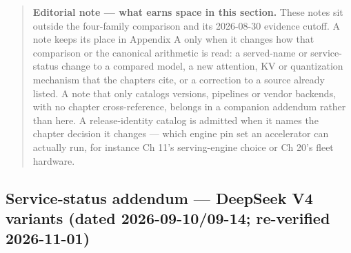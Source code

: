 \begin{quote}
\textbf{Editorial note --- what earns space in this section.} These
notes sit outside the four-family comparison and its 2026-08-30 evidence
cutoff. A note keeps its place in Appendix A only when it changes how
that comparison or the canonical arithmetic is read: a served-name or
service-status change to a compared model, a new attention, KV or
quantization mechanism that the chapters cite, or a correction to a
source already listed. A note that only catalogs versions, pipelines or
vendor backends, with no chapter cross-reference, belongs in a companion
addendum rather than here. A release-identity catalog is admitted when
it names the chapter decision it changes --- which engine pin set an
accelerator can actually run, for instance Ch 11's serving-engine choice
or Ch 20's fleet hardware.
\end{quote}

\subsection*{Service-status addendum --- DeepSeek V4 variants (dated
2026-09-10/09-14; re-verified
2026-11-01)}\label{service-status-addendum-deepseek-v4-variants-dated-2026-09-1009-14-re-verified-2026-11-01}

